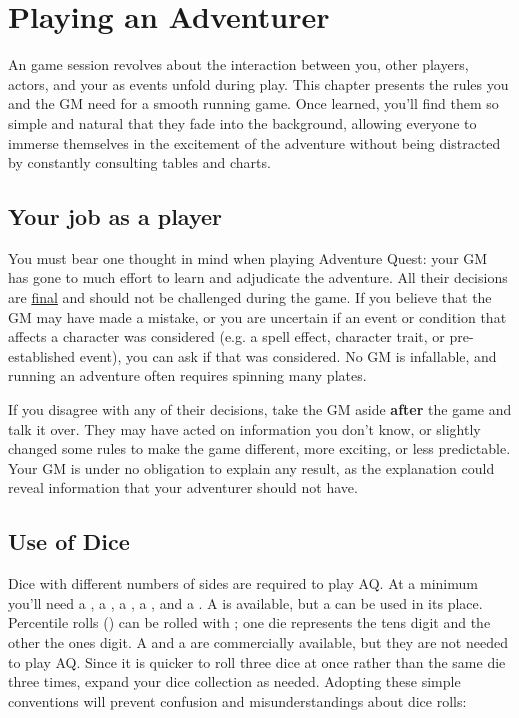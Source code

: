 \chapter{Playing an Adventurer}
\label{ch:play-adventurer}
\setlength{\columnsep}{\defcolwidth}
\begin{multicols}{2}
An \aq game session revolves about the interaction between you, other players, actors, and your  as events unfold during play. This chapter presents the rules you and the GM need for a smooth running game. Once learned, you'll find them so simple and natural that they fade into the background, allowing everyone to immerse themselves in the excitement of the adventure without being distracted by constantly consulting tables and charts.
\section{Your job as a player}
You must bear one thought in mind when playing Adventure Quest: your GM has gone to much effort to learn and adjudicate the adventure. All their decisions are \ul{final} and
should not be challenged during the game. If you believe that the GM may have made a mistake, or you are uncertain if an event or condition that affects a character was considered (e.g. a spell effect, character trait, or pre-established event), you can ask if that was considered. No GM is infallable, and running an adventure often requires spinning many plates.

If you disagree with any of their decisions, take the GM aside \textbf{after} the game and talk it over. They may have acted on information you don't know, or slightly changed some rules to make the game  different, more exciting, or less predictable. Your GM is under no obligation to explain any result, as the explanation could reveal information that your adventurer should not have.
\section{Use of Dice}
Dice with different numbers of sides are required to play AQ. At a minimum you'll need a , a , a , a , and a . A  is available, but a  can be used in its
place. Percentile rolls () can be rolled with  ; one die represents the tens digit and the other the ones digit. A  and a  are commercially available, but they are not needed to play AQ. Since it is quicker to roll three dice at once rather
than the same die three times, expand your dice collection as needed. Adopting these simple conventions will prevent confusion and misunderstandings about dice rolls:


\end{multicols}
